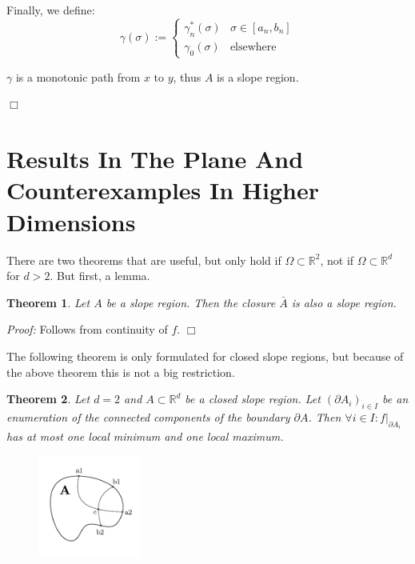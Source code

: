\documentclass[a4paper,12pt,notitlepage,fullpage]{paper}
\theoremstyle{plain}
\newtheorem{thm}{Theorem}[section] %
\theoremstyle{definition}
\begin{document}
Finally, we define:
\begin{equation*}
\gamma(\sigma) :=
\begin{cases}
\gamma_n^*(\sigma) & \sigma \in [a_n, b_n] \\
\gamma_0(\sigma) & \text{elsewhere}
\end{cases}
\end{equation*}

$\gamma$ is a monotonic path from $x$ to $y$, thus $A$ is a slope region.

\hfill $\Box$



\section{Results In The Plane And Counterexamples In Higher Dimensions}

There are two theorems that are useful, but only hold if $\Omega \subset \mathbb R^2$, not if $\Omega \subset \mathbb R^d$ for $d > 2$.
But first, a lemma.

\begin{thm}
Let $A$ be a slope region.
Then the closure $\bar A$ is also a slope region.
\end{thm}

\emph{Proof:} Follows from continuity of $f$.
\hfill $\Box$

The following theorem is only formulated for closed slope regions, but because of the above theorem this is not a big restriction.

\begin{thm}
Let $d = 2$ and $A \subset \mathbb R^d$ be a closed slope region.
Let $(\partial A_i)_{i\in I}$ be an enumeration of the connected components of the boundary $\partial A$.
Then $\forall i \in I : f|_{\partial A_i}$ has at most one local minimum and one local maximum.
\end{thm}

\begin{figure}
\centering
\includegraphics[width=0.3\textwidth]{img/sketch_border_thm.pdf}
\label{fig:sketch_1}
\end{figure}
\end{document}

